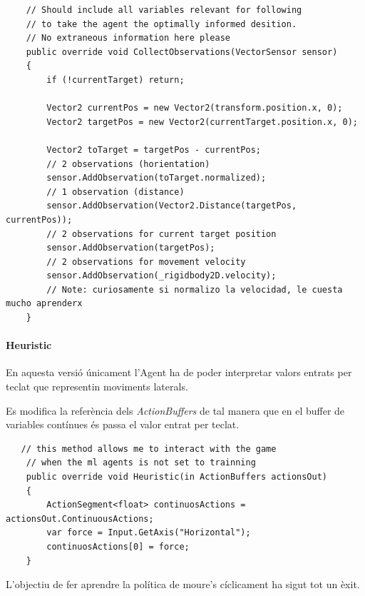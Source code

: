 \documentclass{article}
\begin{document}
    \begin{lstlisting}
    // Should include all variables relevant for following 
    // to take the agent the optimally informed desition.
    // No extraneous information here please
    public override void CollectObservations(VectorSensor sensor)
    {
        if (!currentTarget) return;

        Vector2 currentPos = new Vector2(transform.position.x, 0);
        Vector2 targetPos = new Vector2(currentTarget.position.x, 0);

        Vector2 toTarget = targetPos - currentPos;
        // 2 observations (horientation)
        sensor.AddObservation(toTarget.normalized);
        // 1 observation (distance)
        sensor.AddObservation(Vector2.Distance(targetPos, currentPos));
        // 2 observations for current target position
        sensor.AddObservation(targetPos);
        // 2 observations for movement velocity
        sensor.AddObservation(_rigidbody2D.velocity);
        // Note: curiosamente si normalizo la velocidad, le cuesta mucho aprenderx
    }
    \end{lstlisting}
    
    
    
    
    
   
   \newpage
   
   \paragraph{Heuristic}
   
   En aquesta versió únicament l'Agent ha de poder interpretar valors entrats per teclat que representin moviments laterals.
    
    Es modifica la referència dels \textit{ActionBuffers} de tal manera que en el buffer de variables contínues és passa el valor entrat per teclat. \\
   
   \begin{lstlisting}
   // this method allows me to interact with the game
    // when the ml agents is not set to trainning
    public override void Heuristic(in ActionBuffers actionsOut)
    {
        ActionSegment<float> continuosActions = actionsOut.ContinuousActions;
        var force = Input.GetAxis("Horizontal");
        continuosActions[0] = force;
    }
   \end{lstlisting}
   
    
    L'objectiu de fer aprendre la política de moure's cíclicament ha sigut tot un èxit.
    
\end{document}
